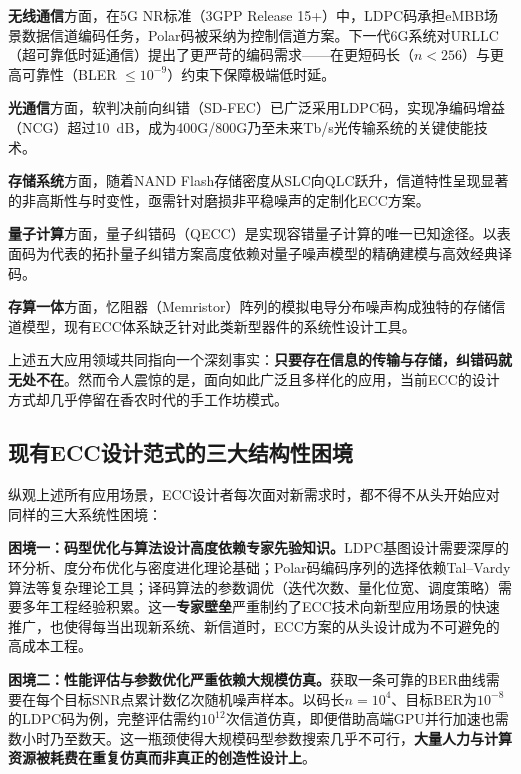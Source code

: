 \textbf{无线通信}方面，在5G NR标准（3GPP Release 15+）中，LDPC码\cite{gallager1962}承担eMBB场景数据信道编码任务，Polar码\cite{arikan2009}被采纳为控制信道方案。下一代6G系统对URLLC（超可靠低时延通信）提出了更严苛的编码需求——在更短码长（$n < 256$）与更高可靠性（BLER $\leq 10^{-9}$）约束下保障极端低时延。

\textbf{光通信}方面，软判决前向纠错（SD-FEC）已广泛采用LDPC码，实现净编码增益（NCG）超过10~dB，成为400G/800G乃至未来Tb/s光传输系统的关键使能技术。

\textbf{存储系统}方面，随着NAND Flash存储密度从SLC向QLC跃升，信道特性呈现显著的非高斯性与时变性，亟需针对磨损非平稳噪声的定制化ECC方案。

\textbf{量子计算}方面，量子纠错码（QECC）是实现容错量子计算的唯一已知途径\cite{shor1995}。以表面码\cite{fowler2012}为代表的拓扑量子纠错方案高度依赖对量子噪声模型的精确建模与高效经典译码。

\textbf{存算一体}方面，忆阻器（Memristor）阵列的模拟电导分布噪声构成独特的存储信道模型，现有ECC体系缺乏针对此类新型器件的系统性设计工具。

上述五大应用领域共同指向一个深刻事实：\textbf{只要存在信息的传输与存储，纠错码就无处不在}。然而令人震惊的是，面向如此广泛且多样化的应用，当前ECC的设计方式却几乎停留在香农时代的手工作坊模式。

\subsection{现有ECC设计范式的三大结构性困境}\label{sec:pain_points}

纵观上述所有应用场景，ECC设计者每次面对新需求时，都不得不从头开始应对同样的三大系统性困境：

\textbf{困境一：码型优化与算法设计高度依赖专家先验知识。}LDPC基图设计需要深厚的环分析、度分布优化与密度进化理论基础\cite{richardson2001}；Polar码编码序列的选择依赖Tal--Vardy算法\cite{tal2013}等复杂理论工具；译码算法的参数调优（迭代次数、量化位宽、调度策略）需要多年工程经验积累。这一\textbf{专家壁垒}严重制约了ECC技术向新型应用场景的快速推广，也使得每当出现新系统、新信道时，ECC方案的从头设计成为不可避免的高成本工程。

\textbf{困境二：性能评估与参数优化严重依赖大规模仿真。}获取一条可靠的BER曲线需要在每个目标SNR点累计数亿次随机噪声样本。以码长$n = 10^4$、目标BER为$10^{-8}$的LDPC码为例，完整评估需约$10^{12}$次信道仿真，即便借助高端GPU并行加速也需数小时乃至数天。这一瓶颈使得大规模码型参数搜索几乎不可行，\textbf{大量人力与计算资源被耗费在重复仿真而非真正的创造性设计上}。

